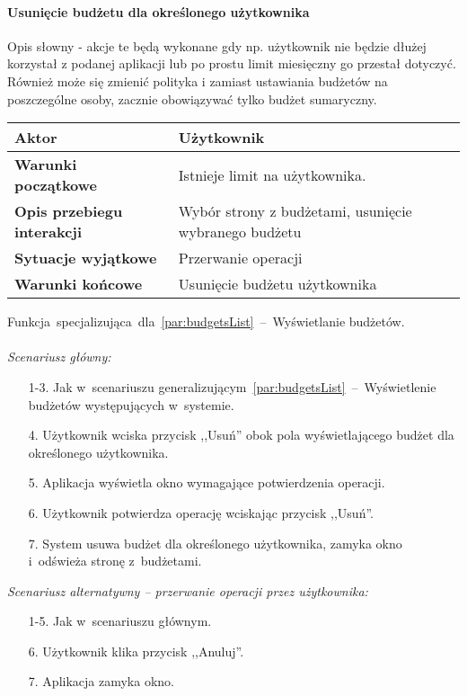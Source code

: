 \paragraph{Usunięcie budżetu dla określonego użytkownika\newline}
\label{par:userBudgetDelete}
Opis słowny - akcje te będą wykonane gdy np. użytkownik nie będzie dłużej korzystał
z podanej aplikacji lub po prostu limit miesięczny go przestał dotyczyć. Również może się
zmienić polityka i zamiast ustawiania budżetów na poszczególne osoby, zacznie obowiązywać
tylko budżet sumaryczny.
\begin{longtable}{|p{5cm}|p{7cm}|}
 	\hline
	\textbf{Aktor} & Użytkownik \\
	\hline
	\textbf{Warunki początkowe} & Istnieje limit na użytkownika.
	\\
	\hline
	\textbf{Opis przebiegu interakcji} & Wybór strony z budżetami, usunięcie wybranego budżetu
	\\
	\hline
	\textbf{Sytuacje wyjątkowe} & Przerwanie operacji
	\\
	\hline
	\textbf{Warunki końcowe} & Usunięcie budżetu użytkownika
	\\
	\hline
 \end{longtable}
Funkcja~specjalizująca~dla~\ref{par:budgetsList}~--~Wyświetlanie budżetów.\\\\
\textit{Scenariusz główny:}
\begin{enumerate}
  \item[1-3.] Jak w~scenariuszu generalizującym~\ref{par:budgetsList}~--~Wyświetlenie budżetów występujących w~systemie.
  \item[4.] Użytkownik wciska przycisk ,,Usuń'' obok pola wyświetlającego budżet dla określonego użytkownika.
  \item[5.] Aplikacja wyświetla okno wymagające potwierdzenia operacji.
  \item[6.] Użytkownik potwierdza operację wciskając przycisk ,,Usuń''.
  \item[7.] System usuwa budżet dla określonego użytkownika, zamyka okno i~odświeża stronę z~budżetami.
\end{enumerate}
\textit{Scenariusz alternatywny -- przerwanie operacji przez użytkownika:}
\begin{enumerate}
  \item[1-5.] Jak w~scenariuszu głównym.
  \item[6.] Użytkownik klika przycisk ,,Anuluj''.
  \item[7.] Aplikacja zamyka okno.
\end{enumerate}

